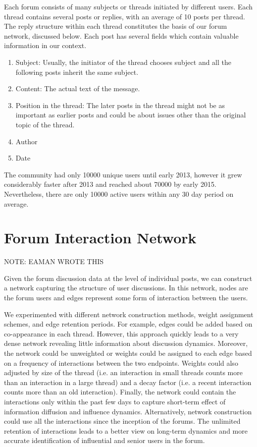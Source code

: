 Each forum consists of many subjects or threads initiated by different users.
Each thread contains several posts or replies, with an average of 10 posts per
thread.  The reply structure within each thread constitutes the basis of our
forum network, discussed below.  Each post has several fields which contain
valuable information in our context.
\begin{enumerate}
  \item{Subject:} Usually, the initiator of the thread chooses subject and all the
    following posts inherit the same subject.
  \item{Content:} The actual text of the message.
  \item{Position in the thread}: The later posts in the thread might not be as important
    as earlier posts and could be about issues other than the original topic of the thread.
  \item{Author}
  \item{Date}
\end{enumerate}

The community had only 10000 unique users until early 2013, however it grew
considerably faster after 2013 and reached about 70000 by early
2015. Nevertheless, there are only 10000 active users within any 30 day period on average.


\section{Forum Interaction Network}
NOTE: EAMAN WROTE THIS

Given the forum discussion data at the level of individual posts, we can construct a
network capturing the structure of user discussions.  In this network, nodes
are the forum users and edges represent some form of interaction between the
users.

We experimented with different network construction methods, weight assignment
schemes, and edge retention periods. For example, edges could be added based on
co-appearance in each thread. However, this approach quickly leads to a very
dense network revealing little information about discussion dynamics. Moreover,
the network could be unweighted or weights could be assigned to each edge based
on a frequency of interactions between the two endpoints. Weights could
also adjusted by size of the thread (i.e. an interaction in small threads counts
more than an interaction in a large thread) and a decay factor (i.e. a recent
interaction counts more than an old interaction).
Finally, the network could contain the interactions only within the past few
days to capture short-term effect of information diffusion and influence
dynamics. Alternatively, network construction could use all the interactions
since the inception of the forums. The unlimited retention of interactions
leads to a better view on long-term dynamics and more accurate identification
of influential and senior users in the forum.

